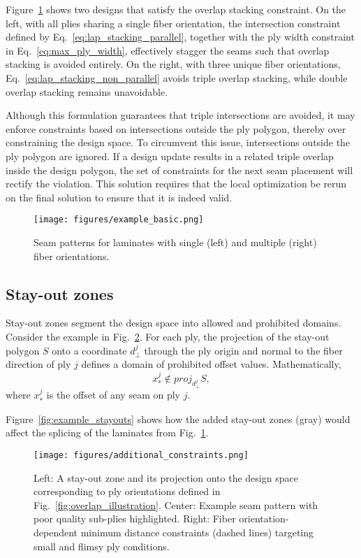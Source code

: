 Figure~\ref{fig:example_basic} shows two designs that satisfy the overlap stacking constraint. On the left, with all plies sharing a single fiber orientation, the intersection constraint defined by Eq.~\eqref{eq:lap_stacking_parallel}, together with the ply width constraint in Eq.~\eqref{eq:max_ply_width}, effectively stagger the seams such that overlap stacking is avoided entirely. On the right, with three unique fiber orientations, Eq.~\eqref{eq:lap_stacking_non_parallel} avoids triple overlap stacking, while double overlap stacking remains unavoidable.

Although this formulation guarantees that triple intersections are avoided, it may enforce constraints based on intersections outside the ply polygon, thereby over constraining the design space. To circumvent this issue, intersections outside the ply polygon are ignored. If a design update results in a related triple overlap inside the design polygon, the set of constraints for the next seam placement will rectify the violation. This solution requires that the local optimization be rerun on the final solution to ensure that it is indeed valid.

\begin{figure}
    \centering
    \texttt{[image: figures/example\_basic.png]}
    \caption{Seam patterns for laminates with single (left) and multiple (right) fiber orientations.}
    \label{fig:example_basic}
\end{figure}

\subsection{Stay-out zones}
Stay-out zones segment the design space into allowed and prohibited domains. Consider the example in Fig.~\ref{fig:additional_constraints}. For each ply, the projection of the stay-out polygon $S$ onto a coordinate $d_{\perp}^j$ through the ply origin and normal to the fiber direction of ply $j$ defines a domain of prohibited offset values. Mathematically,
\begin{equation}
    x_*^j \notin proj_{d_{\perp}^j} S,
\end{equation}
where $x_*^j$ is the offset of any seam on ply $j$.

Figure~\ref{fig:example_stayouts} shows how the added stay-out zones (gray) would affect the splicing of the laminates from Fig.~\ref{fig:example_basic}.

\begin{figure}[h]
    \centering
    \texttt{[image: figures/additional\_constraints.png]}
    \caption{Left: A stay-out zone and its projection onto the design space corresponding to ply orientations defined in Fig.~\ref{fig:overlap_illustration}. Center: Example seam pattern with poor quality sub-plies highlighted. Right: Fiber orientation-dependent minimum distance constraints (dashed lines) targeting small and flimsy ply conditions.}
    \label{fig:additional_constraints}
\end{figure}

